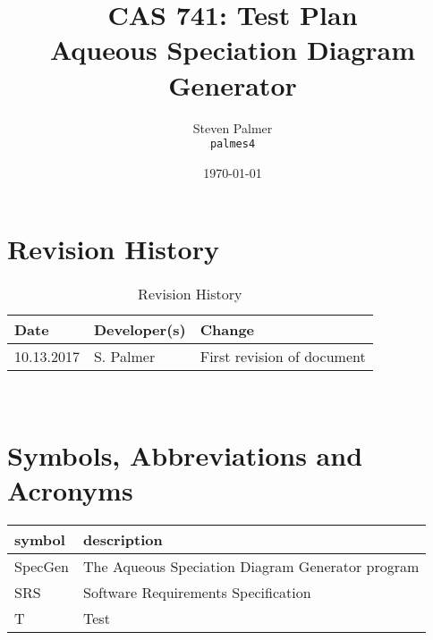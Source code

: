 \documentclass[12pt, titlepage]{article}
\newcommand{\progname}{SpecGen}
\begin{document}

\title{CAS 741: Test Plan\\[10pt]\Large Aqueous Speciation Diagram Generator}
\author{Steven Palmer\\\texttt{palmes4}}
\date{\today}
	
\maketitle


\setcounter{secnumdepth}{0}

\section{Revision History}

\begin{table}[hp]
\caption{Revision History} \label{TblRevisionHistory}
\begin{tabularx}{\textwidth}{llX}
\toprule
\textbf{Date} & \textbf{Developer(s)} & \textbf{Change}\\
\midrule
10.13.2017 & S. Palmer & First revision of document\\
\bottomrule
\end{tabularx}
\end{table}

~\newpage


\section{Symbols, Abbreviations and Acronyms}

\renewcommand{\arraystretch}{1.2}
\begin{tabular}{l l} 
  \toprule		
  \textbf{symbol} & \textbf{description}\\
  \midrule
  \progname{} & The Aqueous Speciation Diagram Generator program\\  
  SRS & Software Requirements Specification\\
  T & Test\\
  \bottomrule
\end{tabular}\\

\newpage

\tableofcontents


\newpage



\setcounter{secnumdepth}{3}
\end{document}
